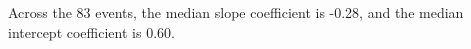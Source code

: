 Across the 83 events, the median slope coefficient is -0.28, and the median intercept coefficient is 0.60.